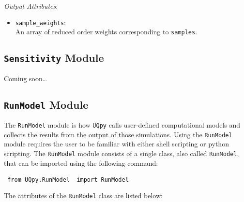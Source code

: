 \noindent\textit{Output Attributes}:
\begin{itemize}

\item {\texttt{sample\_weights}}: \\
An array of reduced order weights corresponding to \texttt{samples}.

\end{itemize}

\subsection{\texttt{Sensitivity} Module}

Coming soon\dots



\subsection{\texttt{RunModel} Module}
\label{Sec:RunModel}

The \texttt{RunModel} module is how \texttt{UQpy} calls user-defined computational models and collects the results from the output of those simulations. Using the \texttt{RunModel} module requires the user to be familiar with either shell scripting or python scripting.  The \texttt{RunModel} module consists of a single class, also called \texttt{RunModel}, that can be imported using the following command:

\vspace{4mm}
\texttt{{\color{blue} from} \texttt{UQpy.RunModel} {\color{blue} import} RunModel}
\vspace{4mm}

\noindent
The attributes of the \texttt{RunModel} class are listed below:

